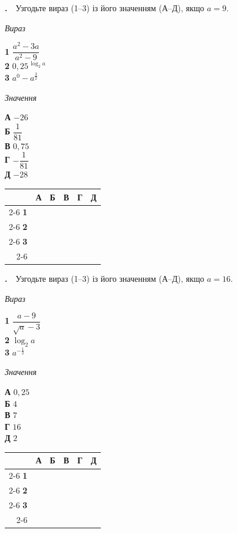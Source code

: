 \documentclass[12pt]{article}
\newcommand{\matchingGrid}{%
    \begingroup
    \renewcommand{\arraystretch}{1.15}
    \setlength{\tabcolsep}{4pt}
    \footnotesize
    \begin{tabular}{r|c|c|c|c|c|}
         \multicolumn{1}{c}{} & \multicolumn{1}{c}{\textbf{А}} & \multicolumn{1}{c}{\textbf{Б}} & \multicolumn{1}{c}{\textbf{В}} & \multicolumn{1}{c}{\textbf{Г}} & \multicolumn{1}{c}{\textbf{Д}} \\ \cline{2-6}
         \textbf{1} & \phantom{X} & \phantom{X} & \phantom{X} & \phantom{X} & \phantom{X} \\ \cline{2-6}
         \textbf{2} & & & & & \\ \cline{2-6}
         \textbf{3} & & & & & \\ \cline{2-6}
    \end{tabular}
    \endgroup
}
\newcounter{zad}
\newcommand{\zadtask}[1]{\stepcounter{zad}\noindent\textbf{\thezad.}\ \ #1\par\vspace{0.2cm}}
\begin{document}
\zadtask{Узгодьте вираз (1--3) із його значенням (А--Д), якщо $a = 9$.

\vspace{0.3cm}
\noindent
\begin{minipage}[t]{0.45\textwidth}
\textit{Вираз}\par\vspace{0.2cm}
\textbf{1} \quad $\dfrac{a^2 - 3a}{a^2 - 9}$\\[0.5cm]
\textbf{2} \quad $0{,}25^{\,\log_2 a}$\\[0.45cm]
\textbf{3} \quad $a^0 - a^{\frac{3}{2}}$
\end{minipage}
\hfill
\begin{minipage}[t]{0.3\textwidth}
\textit{Значення}\par\vspace{0.2cm}
\textbf{А} \quad $-26$\\[0.25cm]
\textbf{Б} \quad $\dfrac{1}{81}$\\[0.2cm]
\textbf{В} \quad $0{,}75$\\[0.2cm]
\textbf{Г} \quad $-\dfrac{1}{81}$\\[0.2cm]
\textbf{Д} \quad $-28$
\end{minipage}
\hfill
\begin{minipage}[t]{0.2\textwidth}
\vspace{0.5cm}
\begin{flushright}\matchingGrid\end{flushright}
\end{minipage}
}
\zadtask{Узгодьте вираз (1--3) із його значенням (А--Д), якщо $a = 16$.

\vspace{0.3cm}
\noindent
\begin{minipage}[t]{0.45\textwidth}
\textit{Вираз}\par\vspace{0.2cm}
\textbf{1} \quad $\dfrac{a - 9}{\sqrt{a} - 3}$\\[0.5cm]
\textbf{2} \quad $\log_2 a$\\[0.45cm]
\textbf{3} \quad $a^{-\frac{1}{2}}$
\end{minipage}
\hfill
\begin{minipage}[t]{0.3\textwidth}
\textit{Значення}\par\vspace{0.2cm}
\textbf{А} \quad $0{,}25$\\[0.25cm]
\textbf{Б} \quad $4$\\[0.2cm]
\textbf{В} \quad $7$\\[0.2cm]
\textbf{Г} \quad $16$\\[0.2cm]
\textbf{Д} \quad $2$
\end{minipage}
\hfill
\begin{minipage}[t]{0.2\textwidth}
\vspace{0.5cm}
\begin{flushright}\matchingGrid\end{flushright}
\end{minipage}
}
\end{document}
